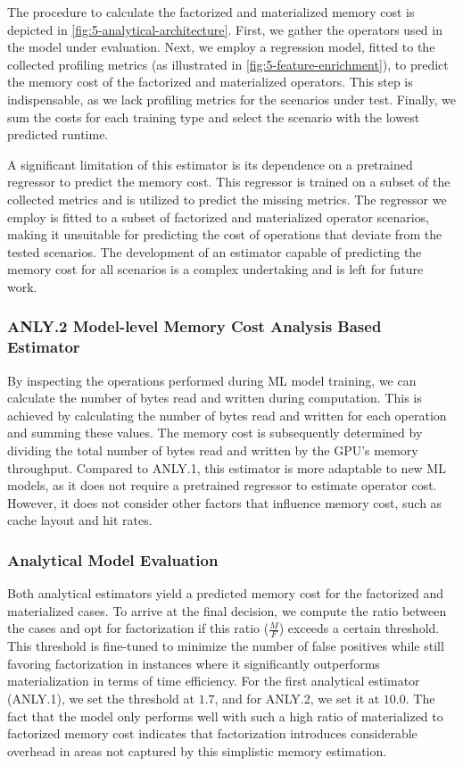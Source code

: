 The procedure to calculate the factorized and materialized memory cost is depicted in \autoref{fig:5-analytical-architecture}. First, we gather the operators used in the model under evaluation. Next, we employ a regression model, fitted to the collected profiling metrics (as illustrated in \autoref{fig:5-feature-enrichment}), to predict the memory cost of the factorized and materialized operators. This step is indispensable, as we lack profiling metrics for the scenarios under test. Finally, we sum the costs for each training type and select the scenario with the lowest predicted runtime.

A significant limitation of this estimator is its dependence on a pretrained regressor to predict the memory cost. This regressor is trained on a subset of the collected metrics and is utilized to predict the missing metrics. The regressor we employ is fitted to a subset of factorized and materialized operator scenarios, making it unsuitable for predicting the cost of operations that deviate from the tested scenarios. The development of an estimator capable of predicting the memory cost for all scenarios is a complex undertaking and is left for future work.

\subsubsection*{ANLY.2 Model-level Memory Cost Analysis Based Estimator}
By inspecting the operations performed during ML model training, we can calculate the number of bytes read and written during computation. This is achieved by calculating the number of bytes read and written for each operation and summing these values. The memory cost is subsequently determined by dividing the total number of bytes read and written by the GPU’s memory throughput. Compared to ANLY.1, this estimator is more adaptable to new ML models, as it does not require a pretrained regressor to estimate operator cost. However, it does not consider other factors that influence memory cost, such as cache layout and hit rates.

\subsubsection{Analytical Model Evaluation}
Both analytical estimators yield a predicted memory cost for the factorized and materialized cases. To arrive at the final decision, we compute the ratio between the cases and opt for factorization if this ratio ($\frac{M}{F}$) exceeds a certain threshold. This threshold is fine-tuned to minimize the number of false positives while still favoring factorization in instances where it significantly outperforms materialization in terms of time efficiency. For the first analytical estimator (ANLY.1), we set the threshold at $1.7$, and for ANLY.2, we set it at $10.0$. The fact that the model only performs well with such a high ratio of materialized to factorized memory cost indicates that factorization introduces considerable overhead in areas not captured by this simplistic memory estimation.

